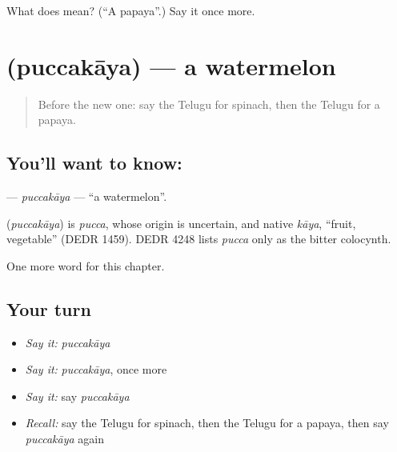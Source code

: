 \begin{tcolorbox}[breakable,colback=teal!4,colframe=teal!35!black,title={Before you move on}]
What does  mean? (\textquotedblleft{}A papaya\textquotedblright{}.) Say it once more.
\end{tcolorbox}
\section[\texorpdfstring{\te{పుచ్చకాయ} (puccakāya)}{పుచ్చకాయ (puccakāya)}]{ (puccakāya) — a watermelon}

\label{lesson:TE-C225-puccakaya}



\begin{quote}
Before the new one: say the Telugu for spinach, then the Telugu for a papaya.
\end{quote}

\subsection*{You'll want to know: }
\textbf{} — \emph{puccakāya} — \textquotedblleft{}a watermelon\textquotedblright{}.

\begin{cousinweb}
\textbf{} (\emph{puccakāya}) is \emph{pucca}, whose origin is uncertain, and native \emph{kāya}, \textquotedblleft{}fruit, vegetable\textquotedblright{} (DEDR 1459). DEDR 4248 lists \emph{pucca} only as the bitter colocynth.
\end{cousinweb}

\begin{grammarlens}[title={What you've built}]
One more word for this chapter.
\end{grammarlens}

\subsection*{Your turn}
\begin{itemize}
\raggedright
  \item \emph{Say it:} \emph{puccakāya}
  \item \emph{Say it:} \emph{puccakāya}, once more
  \item \emph{Say it:} say \emph{puccakāya}
  \item \emph{Recall:} say the Telugu for spinach, then the Telugu for a papaya, then say \emph{puccakāya} again
\end{itemize}

